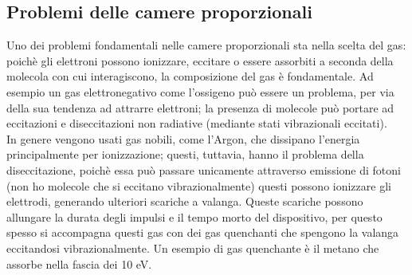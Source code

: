 \subsection{Problemi delle camere proporzionali}
Uno dei problemi fondamentali nelle camere proporzionali sta nella scelta del gas: poich\`e gli elettroni possono ionizzare, eccitare o essere assorbiti a seconda
della molecola con cui interagiscono, la composizione del gas \`e fondamentale.
Ad esempio un gas elettronegativo come l'ossigeno pu\`o essere un problema, per via della sua tendenza ad attrarre elettroni; la presenza di molecole
pu\`o portare ad eccitazioni e diseccitazioni non radiative (mediante stati vibrazionali eccitati).\\
In genere vengono usati gas nobili, come l'Argon, che dissipano l'energia principalmente per ionizzazione; questi, tuttavia, hanno il problema
della diseccitazione, poich\`e essa pu\`o passare unicamente attraverso emissione di fotoni (non ho molecole che si eccitano vibrazionalmente) questi possono
ionizzare gli elettrodi, generando ulteriori scariche a valanga.
Queste scariche possono allungare la durata degli impulsi e il tempo morto del dispositivo, per questo spesso si accompagna questi gas con dei gas
quenchanti che spengono la valanga eccitandosi vibrazionalmente.
Un esempio di gas quenchante \`e il metano che assorbe nella fascia dei 10 eV.
